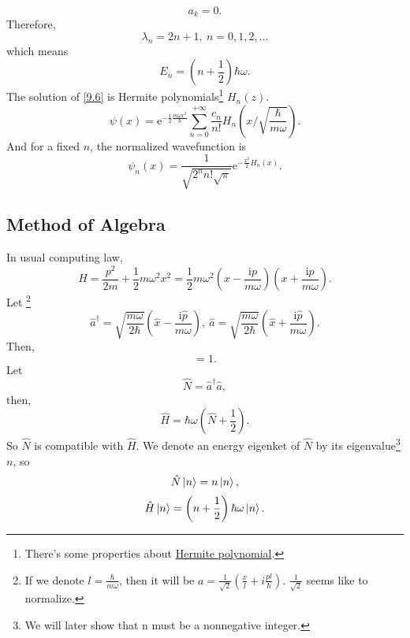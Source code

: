\documentclass{article}
\theoremstyle{1}
\newcommand{\ii}{\mathrm{i}}
\newcommand{\ee}{\mathrm{e}}
\begin{document}
\begin{equation}
    a_{k}=0.
\end{equation}
Therefore, 
\begin{equation}
    \lambda_n=2n+1,\ n=0,1,2,\dots
\end{equation}
which means 
\begin{equation}
    E_n=\left(n+\frac{1}{2}\right)\hbar \omega.
\end{equation}
The solution of \eqref{9.6} is Hermite polynomials\footnote{There's some properties about \href{run:Hermite polynomial.pdf alias}{Hermite polynomial}.} $H_n(z)$.
\begin{equation}
    \psi(x)=\ee^{-\frac{1}{2}\frac{m\omega x^2}{\hbar}}\sum_{n=0}^{+\infty}\frac{c_n}{n!}H_n\left(x\slash\sqrt{\frac{\hbar}{m\omega}}\right).
\end{equation}
And for a fixed $n$, the normalized wavefunction is
\begin{equation}
    \psi_n(x)=\frac{1}{\sqrt{2^nn!\sqrt{\pi}}}\ee^{-\frac{x^2}{2}H_n(x)}.
\end{equation}


\subsection{Method of Algebra}
In usual computing law, 
\begin{equation}
    H=\frac{p^2}{2m}+\frac{1}{2}m\omega^2x^2=\frac{1}{2}m\omega^2\left(x-\frac{\ii p}{m\omega}\right)\left(x+\frac{\ii p}{m\omega}\right).
\end{equation}
Let \footnote{If we denote $l=\frac{\hbar}{m\omega}$, then it will be $a=\frac{1}{\sqrt{2}}\left(\frac{x}{l}+i\frac{pl}{\hbar}\right)$. $\frac{1}{\sqrt{2}}$ seems like to normalize.}
\begin{equation}
    \hat{a}^\dagger=\sqrt{\frac{m\omega}{2\hbar}}\left(\hat{x}-\frac{\ii\hat{p}}{m\omega}\right),\ \hat{a}=\sqrt{\frac{m\omega}{2\hbar}}\left(\hat{x}+\frac{\ii\hat{p}}{m\omega}\right).
\end{equation}
Then, 
\begin{equation}
    [\hat{a},\hat{a}^\dagger]=1.
\end{equation}
Let 
\begin{equation}
    \hat{N}=\hat{a}^\dagger\hat{a},
\end{equation}
then,
\begin{equation}
    \hat{H}=\hbar\omega \left(\hat{N}+\frac{1}{2}\right).
\end{equation}
So $\hat{N}$ is compatible with $\hat{H}$. We denote an energy eigenket of $\hat{N}$ by its eigenvalue\footnote{We will later show that n must be a nonnegative integer.} $n$, so
\begin{equation}
    \hat{N}\ket{n}=n\ket{n},
\end{equation}
\begin{equation}
    \hat{H}\ket{n}=\left(n+\frac{1}{2}\right)\hbar\omega\ket{n}.
\end{equation}
\end{document}
